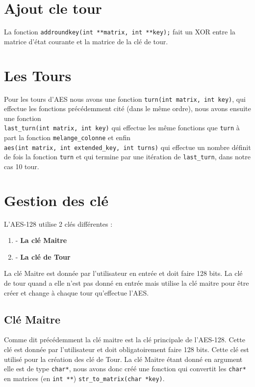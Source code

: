 \documentclass[10pt, a4paper]{report}
\begin{document}
	\section{Ajout cle tour}
	La fonction \verb|addroundkey(int **matrix, int **key);| fait un XOR entre la matrice d'état courante et la matrice de la clé de tour.
	
	\section{Les Tours}
	
	Pour les tours d'AES nous avons une fonction \verb|turn(int matrix, int key)|, qui effectue les fonctions précédemment cité (dans le même ordre), nous avons ensuite une fonction\\  \verb|last_turn(int matrix, int key)| qui effectue les même fonctions que \verb|turn| à part la fonction \verb|melange_colonne| et enfin \\ \verb|aes(int matrix, int extended_key, int turns)| qui effectue un nombre définit de fois la fonction \verb|turn| et qui termine par une itération de \verb|last_turn|, dans notre cas 10 tour.
	
	\section{Gestion des clé}
	
	L'AES-128 utilise 2 clés différentes : 
	\begin{enumerate}
		\item - \textbf{La clé Maitre}
		\item - \textbf{La clé de Tour}
	\end{enumerate}
	La clé Maitre est donnée par l'utilisateur en entrée et doit faire 128 bits. La clé de tour quand a elle n'est pas donné en entrée mais utilise la clé maitre pour être créer et change à chaque tour qu'effectue l'AES.
	
	\subsection{Clé Maitre}
	Comme dit précédemment la clé maitre est la clé principale de l'AES-128. Cette clé est donnée par l'utilisateur et doit obligatoirement faire 128 bits. Cette clé est utilisé pour la création des clé de Tour. La clé Maitre étant donné en argument elle est de type \verb|char*|, nous avons donc créé une fonction qui convertit les \verb|char*| en matrices (en \verb|int **|) \verb|str_to_matrix(char *key)|. 
	
\end{document}
